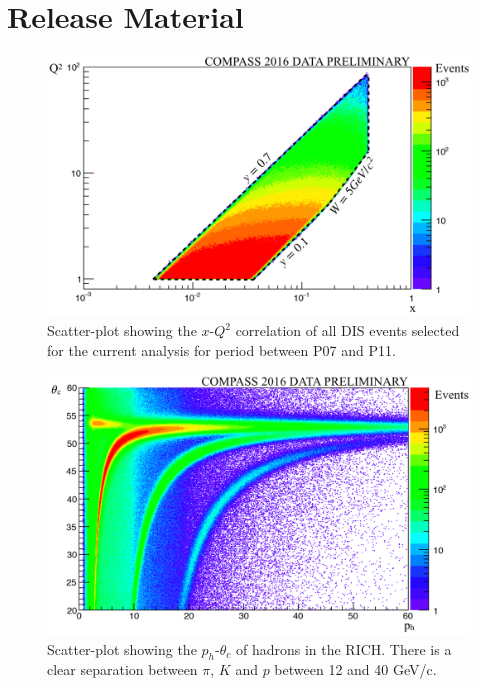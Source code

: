 \documentclass[letterpaper,12pt]{article}
\begin{document}
\section{Release Material} \label{RM}

\begin{figure}[H]
	\centering
	\includegraphics[scale=0.32]{./gfx/xQ2.png}
	\caption{Scatter-plot showing the $x$-$Q^2$ correlation of all DIS events selected for the current analysis for period between P07 and P11.}
	\label{xQ2}
\end{figure}

\begin{figure}[H]
	\centering
	\includegraphics[scale=0.32]{./gfx/RICH.png}
	\caption{Scatter-plot showing the $p_h$-$\theta_c$ of hadrons in the RICH. There is a clear separation between $\pi$, $K$ and $p$ between 12 and 40 GeV/c.}
	\label{RICH}
\end{figure}
\end{document}
